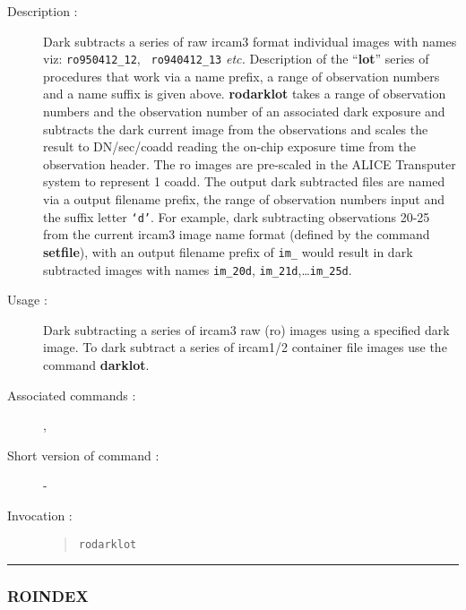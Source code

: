 \begin{description} 

\item[Description :] Dark subtracts a series of raw {\sc ircam3} format
individual images with names viz:  {\tt ro950412\_12}, {\tt
ro940412\_13} \emph{etc.} Description of the ``{\bf lot}'' series of
procedures that work via a name prefix, a range of observation numbers
and a name suffix is given above.  {\bf rodarklot} takes a range of
observation numbers and the observation number of an associated dark
exposure and subtracts the dark current image from the observations and
scales the result to DN/sec/coadd reading the on-chip exposure time
from the observation header.  The {\sc ro} images are pre-scaled in the
ALICE Transputer system to represent 1 coadd.  The output dark
subtracted files are named via a output filename prefix, the range of
observation numbers input and the suffix letter {\tt `d'}.  For
example, dark subtracting observations 20-25 from the current {\sc
ircam3} image name format (defined by the command {\bf setfile}), with
an output filename prefix of {\tt im\_} would result in dark subtracted
images with names {\tt im\_20d}, {\tt im\_21d},\ldots {\tt im\_25d}.

\item[Usage :] Dark subtracting a series of {\sc ircam3} raw ({\sc ro})
images using a specified dark image.  To dark subtract a series of {\sc
ircam1/2} container file images use the command {\bf darklot}.

\item[Associated commands :] {\tt {}}, 
{\tt {}}
\item[Short version of command :] -
\item[Invocation :]

\begin{quote}{\tt  rodarklot }\end{quote}

\end{description}

\hrule 
\subsubsection*{\label{ROINDEX}ROINDEX}

